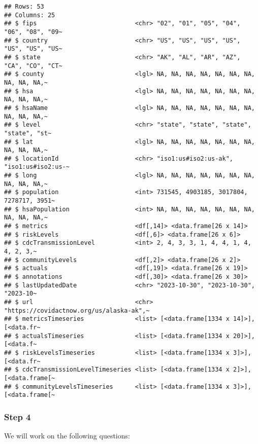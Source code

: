 \documentclass[
]{article}
\begin{document}
\begin{verbatim}
## Rows: 53
## Columns: 25
## $ fips                           <chr> "02", "01", "05", "04", "06", "08", "09~
## $ country                        <chr> "US", "US", "US", "US", "US", "US", "US~
## $ state                          <chr> "AK", "AL", "AR", "AZ", "CA", "CO", "CT~
## $ county                         <lgl> NA, NA, NA, NA, NA, NA, NA, NA, NA, NA,~
## $ hsa                            <lgl> NA, NA, NA, NA, NA, NA, NA, NA, NA, NA,~
## $ hsaName                        <lgl> NA, NA, NA, NA, NA, NA, NA, NA, NA, NA,~
## $ level                          <chr> "state", "state", "state", "state", "st~
## $ lat                            <lgl> NA, NA, NA, NA, NA, NA, NA, NA, NA, NA,~
## $ locationId                     <chr> "iso1:us#iso2:us-ak", "iso1:us#iso2:us-~
## $ long                           <lgl> NA, NA, NA, NA, NA, NA, NA, NA, NA, NA,~
## $ population                     <int> 731545, 4903185, 3017804, 7278717, 3951~
## $ hsaPopulation                  <int> NA, NA, NA, NA, NA, NA, NA, NA, NA, NA,~
## $ metrics                        <df[,14]> <data.frame[26 x 14]>
## $ riskLevels                     <df[,6]> <data.frame[26 x 6]>
## $ cdcTransmissionLevel           <int> 2, 4, 3, 3, 1, 4, 4, 1, 4, 4, 2, 3,~
## $ communityLevels                <df[,2]> <data.frame[26 x 2]>
## $ actuals                        <df[,19]> <data.frame[26 x 19]>
## $ annotations                    <df[,30]> <data.frame[26 x 30]>
## $ lastUpdatedDate                <chr> "2023-10-30", "2023-10-30", "2023-10~
## $ url                            <chr> "https://covidactnow.org/us/alaska-ak",~
## $ metricsTimeseries              <list> [<data.frame[1334 x 14]>], [<data.fr~
## $ actualsTimeseries              <list> [<data.frame[1334 x 20]>], [<data.f~
## $ riskLevelsTimeseries           <list> [<data.frame[1334 x 3]>], [<data.fr~
## $ cdcTransmissionLevelTimeseries <list> [<data.frame[1334 x 2]>], [<data.frame[~
## $ communityLevelsTimeseries      <list> [<data.frame[1334 x 3]>], [<data.frame[~
\end{verbatim}

\hypertarget{step-4}{%
\subsubsection{Step 4}\label{step-4}}

We will work on the following questions:
\end{document}
